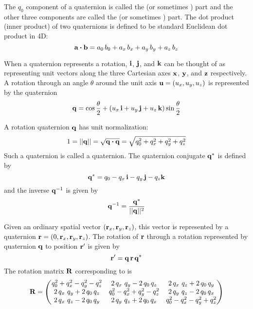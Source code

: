 The $q_0$ component of a quaternion is called the  (or sometimes ) part and the
other three components are called the  (or sometimes ) part. The dot
product (inner product) of two quaternions is defined to be standard Euclidean dot product in 4D:
\begin{equation}
  {\bf a} \mathbin{\boldsymbol{\cdot}} {\bf b} = a_0 \, b_0 + a_x \, b_x + a_y \, b_y + a_z \, b_z
\end{equation}

When a quaternion represents a rotation, ${\bf i}$, ${\bf j}$, and ${\bf k}$ can be thought of as representing unit
vectors along the three Cartesian axes ${\bf x}$, ${\bf y}$, and ${\bf z}$ respectively. A rotation through an angle
$\theta$ around the unit axis ${\bf u} = (u_x, u_y, u_z)$ is represented by the quaternion
\begin{equation}
  {\bf q} = \cos\frac{\theta}{2} + (u_x \, {\bf i} + u_y \, {\bf j} + u_z \, {\bf k}) \sin\frac{\theta}{2}
  \label{qt2ui}
\end{equation}

A rotation quaternion ${\bf q}$ has unit normalization:
\begin{equation}
  1 = ||{\bf q}|| = \sqrt{{\bf q} \mathbin{\boldsymbol{\cdot}} {\bf q}} = \sqrt{q_0^2 + q_x^2 + q_y^2 + q_z^2}
  \label{1qqq}
\end{equation}
Such a quaternion is called a  quaternion.
The quaternion conjugate ${\bf q}^*$ is defined by
\begin{equation}
  {\bf q}^* = q_0 - q_x \, {\bf i} - q_y \, {\bf j} - q_z {\bf k}
\end{equation}
and the inverse ${\bf q}^{-1}$ is given by
\begin{equation}
  {\bf q}^{-1} = \frac{{\bf q}^*}{||{\bf q}||^2}
\end{equation}

Given an ordinary spatial vector $({\bf r}_x, {\bf r}_y, {\bf r}_z)$, this vector is represented by a
quaternion ${\bf r} = (0, {\bf r}_x, {\bf r}_y, {\bf r}_z)$. The rotation of ${\bf r}$ through a rotation
represented by quaternion ${\bf q}$ to position ${\bf r}'$ is given by
\begin{equation}
  {\bf r}' = {\bf q} \, {\bf r} \, {\bf q}^*
  \label{rqrq}
\end{equation}
The rotation matrix ${\bf R}$ corresponding to  is
\begin{equation}
  {\bf R} = \begin{pmatrix}
    q_0^2 + q_x^2 - q_y^2 - q_z^2    & 2 \, q_x \ q_y - 2 \, q_0 \, q_z & 2 \, q_x \ q_z + 2 \, q_0 \, q_y \\
    2 \, q_x \ q_y + 2 \, q_0 \, q_z & q_0^2 - q_x^2 + q_y^2 - q_z^2    & 2 \, q_y \ q_z - 2 \, q_0 \, q_x \\
    2 \, q_x \ q_z - 2 \, q_0 \, q_y & 2 \, q_y \ q_z + 2 \, q_0 \, q_x & q_0^2 - q_x^2 - q_y^2 + q_z^2 
  \end{pmatrix}
  \label{rqqq}
\end{equation}

